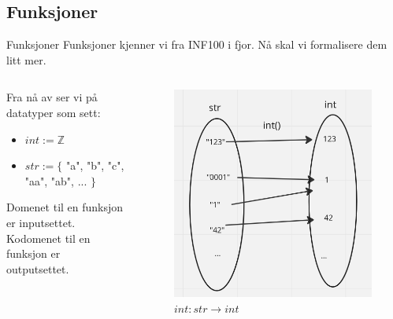 \subsection{Funksjoner}
\begin{frame}{Funksjoner}
    Funksjoner kjenner vi fra INF100 i fjor. Nå skal vi formalisere dem litt mer.\\
    \begin{columns}
        \begin{column}{0.5\textwidth}
            Fra nå av ser vi på datatyper som sett:
            \begin{itemize}
                \item $int := \mathbb{Z}$
                \item $str := \{$ "a", "b", "c", "aa", "ab", ... $\}$
            \end{itemize}
            Domenet til en funksjon er inputsettet.\\
            Kodomenet til en funksjon er outputsettet.
        \end{column}
        \pause
        \begin{column}{0.5\textwidth}
            \begin{figure}
               \includegraphics[scale = 0.4]{images/int.png} 
               \caption{$int : str \rightarrow int$}
            \end{figure}   
        \end{column}
    \end{columns}
\end{frame}

